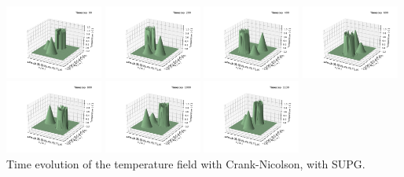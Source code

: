 \begin{center}
\includegraphics[width=3.2cm]{python_codes/fieldstone_43/results/experiment2/supg/solution_0000.pdf}
\includegraphics[width=3.2cm]{python_codes/fieldstone_43/results/experiment2/supg/solution_0200.pdf}
\includegraphics[width=3.2cm]{python_codes/fieldstone_43/results/experiment2/supg/solution_0400.pdf}
\includegraphics[width=3.2cm]{python_codes/fieldstone_43/results/experiment2/supg/solution_0600.pdf}\\
\includegraphics[width=3.2cm]{python_codes/fieldstone_43/results/experiment2/supg/solution_0800.pdf}
\includegraphics[width=3.2cm]{python_codes/fieldstone_43/results/experiment2/supg/solution_1000.pdf}
\includegraphics[width=3.2cm]{python_codes/fieldstone_43/results/experiment2/supg/solution_1130.pdf}\\
{\captionfont Time evolution of the temperature field with Crank-Nicolson, with SUPG.}
\end{center}


